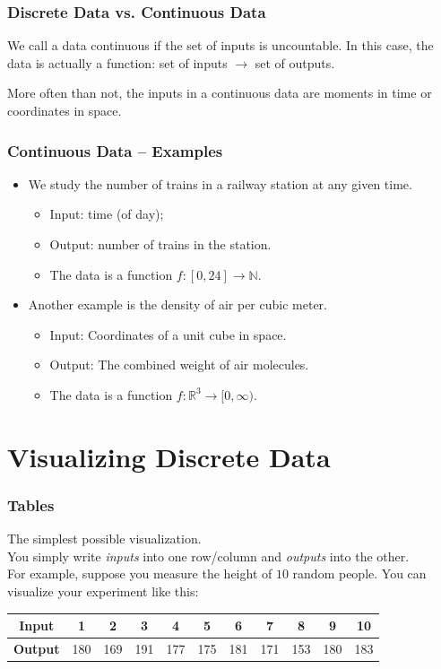 \documentclass[aspectratio=169,11pt,svgnames]{beamer}
\begin{document}
\begin{frame}
 \frametitle{Discrete Data vs. Continuous Data}
 \begin{tcolorbox}[title=Continuous Data]
  We call a data \alert{continuous} if the set of inputs is \alert{uncountable}.
  In this case, the data is actually a \alert{function}: set of inputs $ \to $
  set of outputs.
 \end{tcolorbox}
 \pause
 More often than not, the inputs in a continuous data are \alert{moments in
 time} or \alert{coordinates in space}.
\end{frame}

\begin{frame}
 \frametitle{Continuous Data -- Examples}
 \begin{itemize}[label=\textbullet]
  \item We study the number of trains in a railway station at any given time.
  \pause
  \begin{itemize}[label=\textminus]
   \item Input: time (of day);
   \pause
   \item Output: number of trains in the station.
   \pause
   \item The data is a function $f:[0,24] \to \mathbb{N}$.
  \end{itemize}
 \pause
 \item Another example is the density of air per cubic meter.
 \pause
 \begin{itemize}[label=\textminus] 
  \item Input: Coordinates of a unit cube in space.
  \pause
  \item Output: The combined weight of air molecules.
  \pause
  \item The data is a function $f:\mathbb{R}^3 \to [0,\infty)$. 
 \end{itemize}
 \end{itemize}
\end{frame}

\section{Visualizing Discrete Data}

\begin{frame}
 \frametitle{Tables}
 The simplest possible visualization.\\
 \pause
 You simply write \emph{inputs} into one row/column and \emph{outputs} into the
 other.\\
 \pause
 For example, suppose you measure the height of $10$ random people. You can
 visualize your experiment like this:
 \pause
 \begin{center}
  \begin{tabular}{c|cccccccccc}
   \textbf{Input} & 1 & 2 & 3 & 4 & 5 & 6 & 7 & 8 & 9 & 10\\
   \midrule
   \textbf{Output} & 180 & 169 & 191 & 177 & 175 & 181 & 171 & 153 & 180 & 183
  \end{tabular}
 \end{center}
\end{frame}
\end{document}

